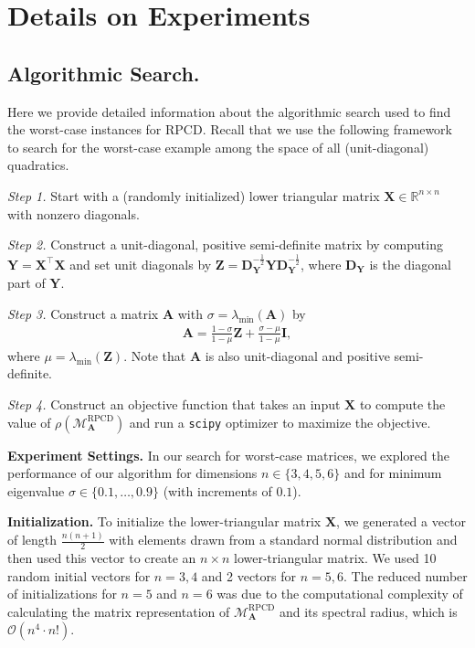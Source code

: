 \documentclass{article}
\theoremstyle{plain}
\theoremstyle{definition}
\theoremstyle{remark}
\newcommand{\RPCD}{\text{RPCD}} %
\newcommand{\MARPCD}{\mathcal{M}_{\bm{A}}^{\RPCD}} %
\def\mA{{\bm{A}}}
\def\mD{{\bm{D}}}
\def\mI{{\bm{I}}}
\def\mX{{\bm{X}}}
\def\mY{{\bm{Y}}}
\def\mZ{{\bm{Z}}}
\def\gO{{\mathcal{O}}}
\newcommand{\R}{\mathbb{R}}
\begin{document}
\section{Details on Experiments}
\label{sec:f}


\subsection{Algorithmic Search.}
\label{sec:f.1}
Here we provide detailed information about the algorithmic search used to find the worst-case instances for RPCD.
Recall that we use the following framework to search for the worst-case example among the space of all (unit-diagonal) quadratics.
\begin{mdframed}[backgroundcolor=black!10]
    \emph{Step 1.} Start with a (randomly initialized) lower triangular matrix $\mX \in \R^{n \times n}$ with nonzero diagonals.

    \emph{Step 2.} Construct a unit-diagonal, positive semi-definite matrix by computing $\mY = \mX^{\top} \mX$ and set unit diagonals by $\mZ = \mD_{\mY}^{-\frac12} \mY \mD_{\mY}^{-\frac12}$, where $\mD_{\mY}$ is the diagonal part of $\mY$.
    
    \emph{Step 3.} Construct a matrix $\mA$ with $\sigma = \lambda_{\min} (\mA)$ by
    \begin{align*}
        \mA = \frac{1 - \sigma}{1 - \mu} \mZ + \frac{\sigma - \mu}{1 - \mu} \mI,
    \end{align*}
    where $\mu = \lambda_{\min} (\mZ)$.
    Note that $\mA$ is also unit-diagonal and positive semi-definite.
    
    \emph{Step 4.} Construct an objective function that takes an input $\mX$ to compute the value of $\rho(\MARPCD)$ and run a \texttt{scipy} optimizer to maximize the objective.
\end{mdframed}

\textbf{Experiment Settings.}
In our search for worst-case matrices, we explored the performance of our algorithm for dimensions $n \in \{3, 4, 5, 6\}$ and for minimum eigenvalue $\sigma \in \{0.1, \dots, 0.9\}$ (with increments of $0.1$).

\textbf{Initialization.} To initialize the lower-triangular matrix $\mX$, we generated a vector of length $\frac{n(n+1)}{2}$ with elements drawn from a standard normal distribution and then used this vector to create an $n \times n$ lower-triangular matrix. We used 10 random initial vectors for $n=3, 4$ and 2 vectors for $n=5, 6$. The reduced number of initializations for $n=5$ and $n=6$ was due to the computational complexity of calculating the matrix representation of $\MARPCD$ and its spectral radius, which is $\gO(n^4\cdot n!)$.
\end{document}
